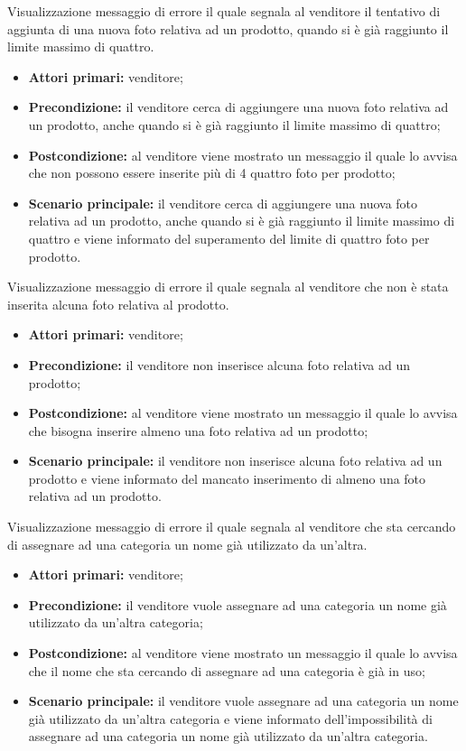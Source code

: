 Visualizzazione messaggio di errore il quale segnala al venditore il tentativo di aggiunta di una nuova foto relativa ad un prodotto, quando si è già raggiunto il limite massimo di quattro.
\begin{itemize}
    \item \textbf{Attori primari:} venditore;
    \item \textbf{Precondizione:} il venditore cerca di aggiungere una nuova foto relativa ad un prodotto, anche quando si è già raggiunto il limite massimo di quattro;
    \item \textbf{Postcondizione:} al venditore viene mostrato un messaggio il quale lo avvisa che non possono essere inserite più di 4 quattro foto per prodotto;
    \item \textbf{Scenario principale:} il venditore cerca di aggiungere una nuova foto relativa ad un prodotto, anche quando si è già raggiunto il limite massimo di quattro e viene informato del superamento del limite di quattro foto per prodotto.
\end{itemize}

Visualizzazione messaggio di errore il quale segnala al venditore che non è stata inserita alcuna foto relativa al prodotto.
\begin{itemize}
    \item \textbf{Attori primari:} venditore;
    \item \textbf{Precondizione:} il venditore non inserisce alcuna foto relativa ad un prodotto;
    \item \textbf{Postcondizione:} al venditore viene mostrato un messaggio il quale lo avvisa che bisogna inserire almeno una foto relativa ad un prodotto;
    \item \textbf{Scenario principale:} il venditore non inserisce alcuna foto relativa ad un prodotto e viene informato del mancato inserimento di almeno una foto relativa ad un prodotto.
\end{itemize}

Visualizzazione messaggio di errore il quale segnala al venditore che sta cercando di assegnare ad una categoria un nome già utilizzato da un'altra.
\begin{itemize}
    \item \textbf{Attori primari:} venditore;
    \item \textbf{Precondizione:} il venditore vuole assegnare ad una categoria un nome già utilizzato da un'altra categoria;
    \item \textbf{Postcondizione:} al venditore viene mostrato un messaggio il quale lo avvisa che il nome che sta cercando di assegnare ad una categoria è già in uso;
    \item \textbf{Scenario principale:} il venditore vuole assegnare ad una categoria un nome già utilizzato da un'altra categoria e viene informato dell'impossibilità di assegnare ad una categoria un nome già utilizzato da un'altra categoria.
\end{itemize}

